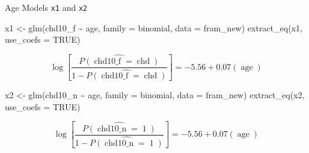 \documentclass[
  ignorenonframetext,
]{beamer}
\newenvironment{Shaded}{\begin{snugshade}}{\end{snugshade}}
\newcommand{\AttributeTok}[1]{\textcolor[rgb]{0.77,0.63,0.00}{#1}}
\newcommand{\ConstantTok}[1]{\textcolor[rgb]{0.00,0.00,0.00}{#1}}
\newcommand{\FunctionTok}[1]{\textcolor[rgb]{0.00,0.00,0.00}{#1}}
\newcommand{\NormalTok}[1]{#1}
\newcommand{\OtherTok}[1]{\textcolor[rgb]{0.56,0.35,0.01}{#1}}
\newcommand{\SpecialCharTok}[1]{\textcolor[rgb]{0.00,0.00,0.00}{#1}}
\begin{document}
\begin{frame}[fragile]{Age Models \texttt{x1} and \texttt{x2}}
\protect\hypertarget{age-models-x1-and-x2}{}
\begin{Shaded}
\begin{Highlighting}[]
\NormalTok{x1 }\OtherTok{\textless{}{-}} \FunctionTok{glm}\NormalTok{(chd10\_f }\SpecialCharTok{\textasciitilde{}}\NormalTok{ age, }
          \AttributeTok{family =}\NormalTok{ binomial, }\AttributeTok{data =}\NormalTok{ fram\_new)}
\FunctionTok{extract\_eq}\NormalTok{(x1, }\AttributeTok{use\_coefs =} \ConstantTok{TRUE}\NormalTok{)}
\end{Highlighting}
\end{Shaded}

\begin{equation}
\log\left[ \frac { \widehat{P( \operatorname{chd10\_f} = \operatorname{chd} )} }{ 1 - \widehat{P( \operatorname{chd10\_f} = \operatorname{chd} )} } \right] = -5.56 + 0.07(\operatorname{age})
\end{equation}

\begin{Shaded}
\begin{Highlighting}[]
\NormalTok{x2 }\OtherTok{\textless{}{-}} \FunctionTok{glm}\NormalTok{(chd10\_n }\SpecialCharTok{\textasciitilde{}}\NormalTok{ age, }
          \AttributeTok{family =}\NormalTok{ binomial, }\AttributeTok{data =}\NormalTok{ fram\_new)}
\FunctionTok{extract\_eq}\NormalTok{(x2, }\AttributeTok{use\_coefs =} \ConstantTok{TRUE}\NormalTok{)}
\end{Highlighting}
\end{Shaded}

\begin{equation}
\log\left[ \frac { \widehat{P( \operatorname{chd10\_n} = \operatorname{1} )} }{ 1 - \widehat{P( \operatorname{chd10\_n} = \operatorname{1} )} } \right] = -5.56 + 0.07(\operatorname{age})
\end{equation}
\end{frame}
\end{document}
